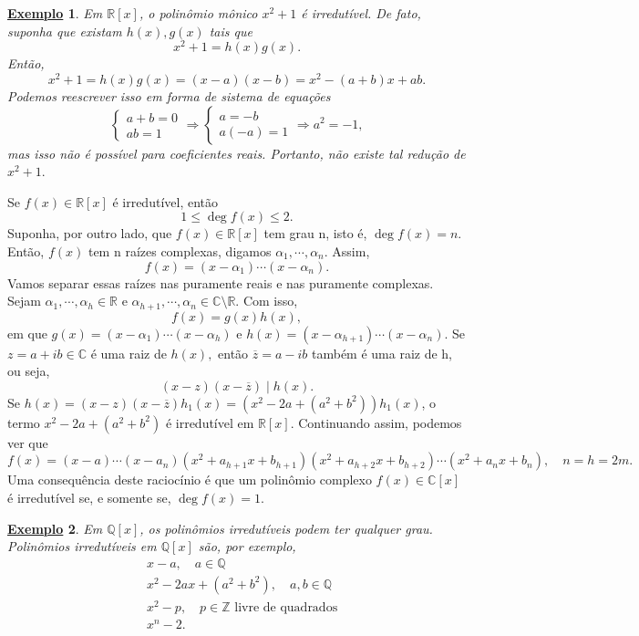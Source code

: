 \documentclass{article}
\newtheorem{example}{\underline{Exemplo}}
\begin{document}
    \begin{example}
      Em \(\mathbb{R}[x]\), o polinômio mônico \(x^{2} + 1\) é irredutível. De fato, suponha que existam 
      \(h(x), g(x)\) tais que 
      \[
        x^{2} + 1 = h(x)g(x).
      \]
      Então,
      \[
        x^{2} + 1 = h(x)g(x) = (x-a)(x-b) = x^{2} - (a+b)x +ab.
      \]
      Podemos reescrever isso em forma de sistema de equações 
      \[
        \left\{\begin{array}{ll}
            a + b = 0\\
            ab = 1
        \end{array}\right. 
        \Rightarrow  
        \left\{\begin{array}{ll}
            a = -b\\
            a(-a) = 1
        \end{array}\right.
        \Rightarrow 
        a^{2} = -1,
      \]
      mas isso não é possível para coeficientes reais. Portanto, não existe tal redução de \(x^{2} + 1.\)
    \end{example}
    Se \(f(x)\in \mathbb{R}[x]\) é irredutível, então 
    \[
      1\leq \deg{f(x)}\leq 2.
    \]
    Suponha, por outro lado, que \(f(x)\in \mathbb{R}[x]\) tem grau n, isto é, \(\deg{f(x)} = n.\) Então, \(f(x)\) tem n raízes complexas,
    digamos \(\alpha_{1}, \cdots, \alpha_{n}\). Assim, 
    \[
      f(x) = (x-\alpha_{1})\cdots(x-\alpha_{n}).
    \]
    Vamos separar essas raízes nas puramente reais e nas puramente complexas. Sejam \(\alpha_{1}, \cdots, \alpha_{h}\in \mathbb{R}\) e
    \(\alpha_{h+1}, \cdots, \alpha_{n}\in \mathbb{C}\setminus{\mathbb{R}}.\) Com isso, 
    \[
      f(x) = g(x)h(x),
    \]
    em que \(g(x) = (x-\alpha_{1})\cdots(x-\alpha_{h})\) e \(h(x) = (x-\alpha_{h+1})\cdots(x-\alpha_{n}).\)
    Se \(z = a + ib\in \mathbb{C}\) é uma raiz de \(h(x),\) então \(\overline{z} = a - ib\) também é uma raiz de h, ou seja, 
    \[
      (x-z)(x-\overline{z})\mid h(x).
    \]
    Se \(h(x) = (x-z)(x-\overline{z})h_{1}(x) = (x^{2}-2a + (a^{2}+b^{2}))h_{1}(x)\), o termo 
    \(x^{2}-2a + (a^{2}+b^{2})\) é irredutível em \(\mathbb{R}[x]\). Continuando assim, podemos ver que 
    \[
      f(x) = (x-a)\cdots(x-a_{n})(x^{2}+a_{h+1}x + b_{h+1})(x^{2}+a_{h+2}x+b_{h+2})\cdots(x^{2}+a_{n}x + b_{n}),\quad n = h = 2m.
    \]
    Uma consequência deste raciocínio é que um polinômio complexo \(f(x)\in \mathbb{C}[x]\) é irredutível se, e somente se, \(\deg{f(x)} = 1.\)
    \begin{example}
      Em \(\mathbb{Q}[x]\), os polinômios irredutíveis podem ter qualquer grau. Polinômios irredutíveis em \(\mathbb{Q}[x]\)
      são, por exemplo, 
      \begin{align*}
  &x-a,\quad a\in \mathbb{Q}\\
  &x^{2}-2ax + (a^{2}+b^{2}),\quad a, b\in \mathbb{Q}\\
  &x^{2} - p,\quad p\in \mathbb{Z}\text{ livre de quadrados}\\
  &x^{n} - 2.
      \end{align*}
    \end{example}
\end{document}
